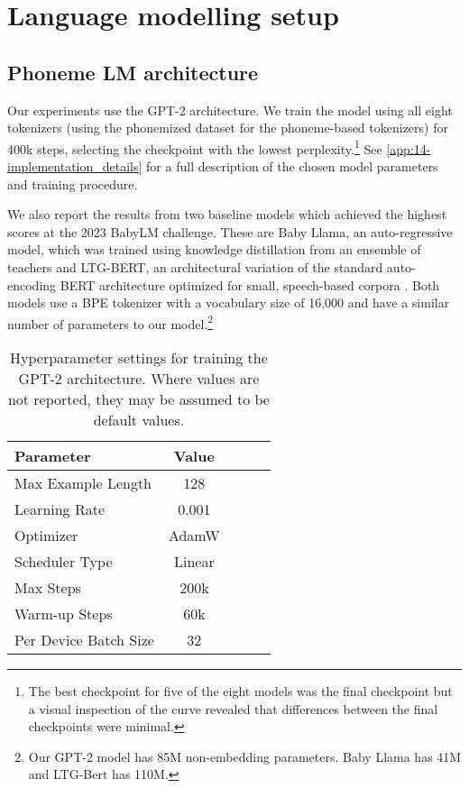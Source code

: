 \section{Language modelling setup}\label{sec:14-lmsetup}

\subsection{Phoneme LM architecture}\label{sec:14-phonemearchitecture}

Our experiments use the GPT-2 architecture. We train the model using all eight tokenizers (using the phonemized dataset for the phoneme-based tokenizers) for 400k steps, selecting the checkpoint with the lowest perplexity.\footnote{The best checkpoint for five of the eight models was the final checkpoint but a visual inspection of the curve revealed that differences between the final checkpoints were minimal.} See \cref{app:14-implementation_details} for a full description of the chosen model parameters and training procedure.

We also report the results from two baseline models which achieved the highest scores at the 2023 BabyLM challenge. These are Baby Llama, an auto-regressive model, which was trained using knowledge distillation from an ensemble of teachers \citep{timiryasov-tastet-2023-baby} and LTG-BERT, an architectural variation of the standard auto-encoding BERT architecture optimized for small, speech-based corpora \citep{samuel-etal-2023-trained, charpentier-samuel-2023-layers}. Both models use a BPE tokenizer with a vocabulary size of 16,000 and have a similar number of parameters to our model.\footnote{Our GPT-2 model has 85M non-embedding parameters. Baby Llama has 41M and LTG-Bert has 110M.}  


\begin{table}[!ht]
    \centering
    \small
    \begin{tabular}{lcccc}
    \toprule
         Parameter & Value \\
         \midrule
         Max Example Length & 128 \\
         Learning Rate & 0.001\\
         Optimizer & AdamW \\
         Scheduler Type & Linear\\
         Max Steps & 200k \\
         Warm-up Steps & 60k \\
         Per Device Batch Size & 32 \\
    \bottomrule
    \end{tabular}
    \caption{Hyperparameter settings for training the GPT-2 architecture. Where values are not reported, they may be assumed to be default values.}
    \label{tab:13-training_params}
\end{table}

